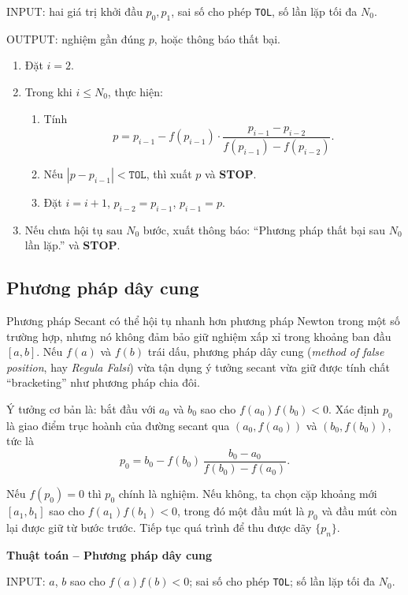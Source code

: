 INPUT: hai giá trị khởi đầu $p_0, p_1$, sai số cho phép \texttt{TOL}, số lần lặp tối đa $N_0$.  

OUTPUT: nghiệm gần đúng $p$, hoặc thông báo thất bại.

\begin{enumerate}
  \item Đặt $i = 2$.
  \item Trong khi $i \leq N_0$, thực hiện:
  \begin{enumerate}
    \item Tính
    \[
    p = p_{i-1} - f(p_{i-1}) \cdot \frac{p_{i-1} - p_{i-2}}{f(p_{i-1}) - f(p_{i-2})}.
    \]
    \item Nếu $|p - p_{i-1}| < \texttt{TOL}$, thì xuất $p$ và \textbf{STOP}.
    \item Đặt $i = i+1$, $p_{i-2} = p_{i-1}$, $p_{i-1} = p$.
  \end{enumerate}
  \item Nếu chưa hội tụ sau $N_0$ bước, xuất thông báo: 
  ``Phương pháp thất bại sau $N_0$ lần lặp.'' và \textbf{STOP}.
\end{enumerate}

\subsection*{\textbf{Phương pháp dây cung}}

Phương pháp Secant có thể hội tụ nhanh hơn phương pháp Newton trong một số trường hợp, 
nhưng nó không đảm bảo giữ nghiệm xấp xỉ trong khoảng ban đầu $[a,b]$. 
Nếu $f(a)$ và $f(b)$ trái dấu, phương pháp dây cung (\textit{method of false position}, 
hay \textit{Regula Falsi}) vừa tận dụng ý tưởng secant vừa giữ được tính chất 
“bracketing” như phương pháp chia đôi.

Ý tưởng cơ bản là: bắt đầu với $a_0$ và $b_0$ sao cho $f(a_0)f(b_0) < 0$. 
Xác định $p_0$ là giao điểm trục hoành của đường secant qua $(a_0,f(a_0))$ và $(b_0,f(b_0))$, tức là
\[
p_0 = b_0 - f(b_0)\,\frac{b_0 - a_0}{f(b_0) - f(a_0)}.
\]

Nếu $f(p_0) = 0$ thì $p_0$ chính là nghiệm. 
Nếu không, ta chọn cặp khoảng mới $[a_1,b_1]$ sao cho $f(a_1)f(b_1)<0$, 
trong đó một đầu mút là $p_0$ và đầu mút còn lại được giữ từ bước trước. 
Tiếp tục quá trình để thu được dãy $\{p_n\}$.

\textbf{Thuật toán – Phương pháp dây cung}

INPUT: $a$, $b$ sao cho $f(a)f(b)<0$; sai số cho phép \texttt{TOL}; số lần lặp tối đa $N_0$.  

